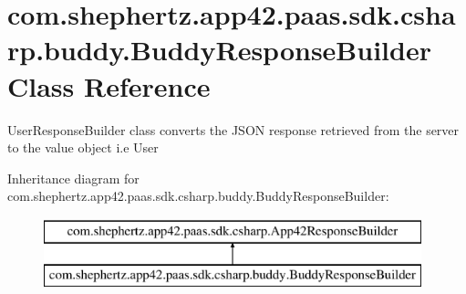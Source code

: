 \hypertarget{classcom_1_1shephertz_1_1app42_1_1paas_1_1sdk_1_1csharp_1_1buddy_1_1_buddy_response_builder}{\section{com.\+shephertz.\+app42.\+paas.\+sdk.\+csharp.\+buddy.\+Buddy\+Response\+Builder Class Reference}
\label{classcom_1_1shephertz_1_1app42_1_1paas_1_1sdk_1_1csharp_1_1buddy_1_1_buddy_response_builder}
}


User\+Response\+Builder class converts the J\+S\+O\+N response retrieved from the server to the value object i.\+e User  


Inheritance diagram for com.\+shephertz.\+app42.\+paas.\+sdk.\+csharp.\+buddy.\+Buddy\+Response\+Builder\+:\begin{figure}[H]
\begin{center}
\leavevmode
\includegraphics[height=2.000000cm]{classcom_1_1shephertz_1_1app42_1_1paas_1_1sdk_1_1csharp_1_1buddy_1_1_buddy_response_builder}
\end{center}
\end{figure}
